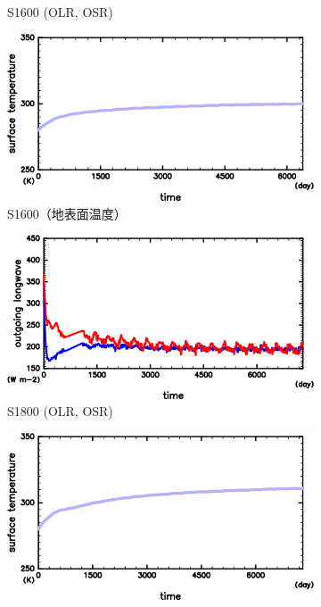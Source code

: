 \documentclass[body]{subfiles}
\begin{document}
\begin{figure}[t]
\begin{subfigure}{.4\textwidth}
		\caption{S1600 (OLR, OSR)}\label{S1600_OLRA}
	\end{subfigure}
	\begin{subfigure}{.4\textwidth}
		\centering
		\includegraphics[width=\textwidth]{S1600/S1600_SurfTemp_horimean_time0.0-7300.0-crop.png}
		\caption{S1600（地表面温度）}\label{S1600_SurfTemp}
	\end{subfigure}
	\begin{subfigure}{.4\textwidth}
		\centering
		\includegraphics[width=\textwidth]{S1800/S1800_OLRA-OSRA_horimean_time0.0-7300.0-crop.png}
		\caption{S1800 (OLR, OSR)}\label{S1800_OLRA}
	\end{subfigure}
	\begin{subfigure}{.4\textwidth}
		\centering
		\includegraphics[width=\textwidth]{S1800/S1800_SurfTemp_horimean_time0.0-7300.0-crop.png}

\end{subfigure}
\end{figure}
\end{document}
